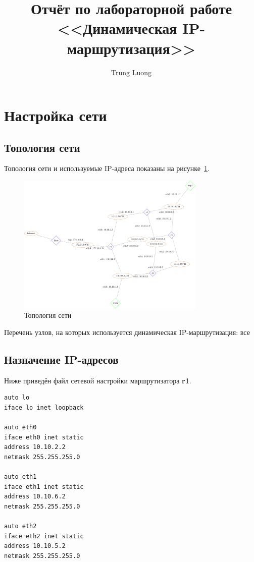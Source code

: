\documentclass[a4paper,12pt]{article}
\title{Отчёт по лабораторной работе \\ <<Динамическая IP-маршрутизация>>}
\author{Trung Luong}
\begin{document}
\maketitle

\tableofcontents

\section{Настройка сети}

\subsection{Топология сети}

Топология сети и используемые IP-адреса показаны на рисунке~\ref{fig:network}.

\begin{figure}
\centering
\includegraphics[width=0.8\textwidth]{includes/network_gv.pdf}
\caption{Топология сети}
\label{fig:network}
\end{figure}

Перечень узлов, на которых используется динамическая IP-маршрутизация: все


\subsection{Назначение IP-адресов}

Ниже приведён файл сетевой настройки  маршрутизатора \textbf{r1}.

\begin{Verbatim}
auto lo
iface lo inet loopback

auto eth0
iface eth0 inet static
address 10.10.2.2
netmask 255.255.255.0

auto eth1
iface eth1 inet static
address 10.10.6.2
netmask 255.255.255.0

auto eth2
iface eth2 inet static
address 10.10.5.2
netmask 255.255.255.0
\end{Verbatim}
\end{document}
